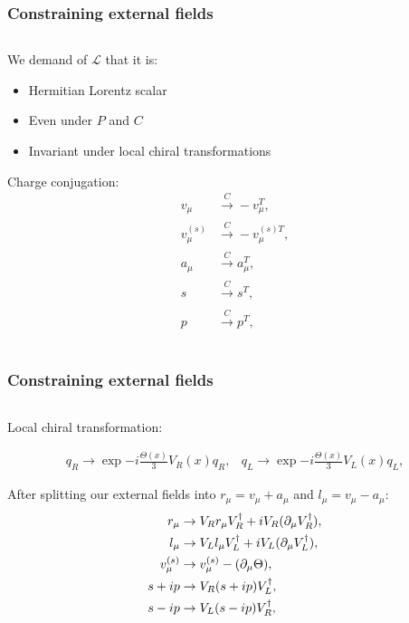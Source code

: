 \documentclass[accentcolor=tud2c,usenames,dvipsnames,colorbacktitle,inverttitle,landscape,german,presentation,t]{tudbeamer}
\begin{document}
  \begin{frame}
    \frametitle{Constraining external fields}
    \begin{columns}[c]
      \begin{column}{0.8\textwidth}
        We demand of $\mathcal{L}$ that it is:
        \begin{itemize}
          \item Hermitian Lorentz scalar
          \item Even under $P$ and $C$
          \item Invariant under local chiral transformations
        \end{itemize}


        Charge conjugation:
\begin{align*}
v_{\mu} &\xrightarrow[]{C} -v^{T}_{\mu}, \\
v_{\mu}^{(s)} &\xrightarrow[]{C} -v^{(s)T}_{\mu}, \\
a_{\mu} &\xrightarrow[]{C} a^{T}_{\mu}, \\
s &\xrightarrow[]{C} s^{T}, \\
p &\xrightarrow[]{C} p^{T},
\end{align*}

      \end{column}
    \end{columns}
  \end{frame}

  \begin{frame}
    \frametitle{Constraining external fields}
    \begin{columns}[c]
      \begin{column}{0.8\textwidth}
        Local chiral transformation:

        \begin{equation*}
          \begin{array}{cc}
            q_{R} \rightarrow \exp{-i\frac{\Theta(x)}{3}} V_{R}(x) q_{R}, &
q_{L} \rightarrow \exp{-i\frac{\Theta(x)}{3}} V_{L}(x) q_{L},
          \end{array}
\end{equation*}

        After splitting our external fields into $r_{\mu}=v_{\mu}+a_{\mu}$ and $l_{\mu}=v_{\mu}-a_{\mu}$:
\begin{align*}
  r_{\mu} &\rightarrow V_{R} r_{\mu} V_{R}^{\dagger} + i V_{R} (\partial_{\mu}V_{R}^{\dagger}), \\
  l_{\mu} &\rightarrow V_{L} l_{\mu} V_{L}^{\dagger} + i V_{L} (\partial_{\mu}V_{L}^{\dagger}), \\
  v_{\mu}^{(s)} &\rightarrow v_{\mu}^{(s)} - (\partial_{\mu}\Theta), \\
  s + ip &\rightarrow V_{R} (s + ip) V_{L}^{\dagger}, \\
  s - ip &\rightarrow V_{L} (s - ip) V_{R}^{\dagger},
\end{align*}
      \end{column}
    \end{columns}
  \end{frame}
\end{document}
